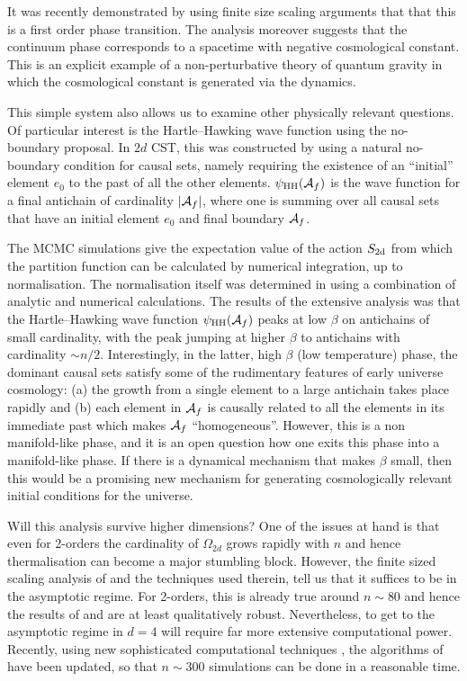 It was  recently  demonstrated by \cite{fss}
using finite size scaling  arguments that that this is a first order phase
transition.  The analysis moreover suggests that the continuum phase
corresponds to a spacetime with negative cosmological constant. This is an explicit example of a non-perturbative theory
of quantum gravity in which the cosmological constant is generated via
the dynamics. 

This simple system also allows us to examine other physically relevant questions. Of particular interest is the
Hartle--Hawking wave function using the no-boundary proposal. In $2d$ CST, this was constructed by \cite{2dhh} using a 
natural no-boundary condition for causal sets, namely requiring the existence of an ``initial'' element $e_0$ to the past of all the other
elements. $\psi_{\rm HH} (\mathcal A_f)$ is the wave function for a final antichain of cardinality $|\mathcal A_f|$, where one is summing
over all causal sets that have an initial element $e_0$ and final boundary $\mathcal A_f$.

The MCMC simulations give the expectation value of the action $S_{\mathrm{2d}}$ from which the partition
function can be calculated by numerical integration, up to normalisation. The normalisation itself was determined in \cite{2dhh} 
using a combination of analytic and numerical calculations.  The results of the extensive analysis was that the
Hartle--Hawking wave function $\psi_{\rm HH}(\mathcal A_f)$ peaks at low $\beta $
on antichains of small cardinality,  with the  peak jumping  at higher $\beta$ to  antichains with cardinality $\sim n/2$.
Interestingly, in 
the latter, high $\beta$ (low temperature) phase,  the dominant causal sets satisfy some of the rudimentary features of early universe cosmology: 
(a) the growth from a single element to a large antichain takes place rapidly and (b) each element in
$\mathcal A_f$ is causally related to all the elements in its immediate past which makes $\mathcal A_f$ ``homogeneous''. However, this is a non manifold-like phase,
and it is an open question how one exits this phase into a manifold-like phase.  If there is a dynamical mechanism that
makes $\beta$ small, then this would be a promising new mechanism for generating cosmologically relevant initial
conditions for the universe. 

Will this analysis survive higher dimensions? One of the issues at hand is that even for 2-orders the cardinality of $\Omega_{2d}$ grows rapidly
with $n$ and hence thermalisation can become a major stumbling block. However, the  finite sized scaling analysis of \cite{fss}
and the techniques used therein, tell us that it suffices to be in the asymptotic regime. For 2-orders, this is
already true around $n \sim 80 $ and hence the results of \cite{2dqg} and \cite{2dhh} are at least qualitatively
robust. Nevertheless, to get to the asymptotic regime in $d=4$  will require far more extensive computational
power. Recently, using new sophisticated computational techniques \citep{willthesis},  the algorithms of
\cite{2dqg} have been updated, so that $n \sim 300 $ simulations can be done in a reasonable time. 

